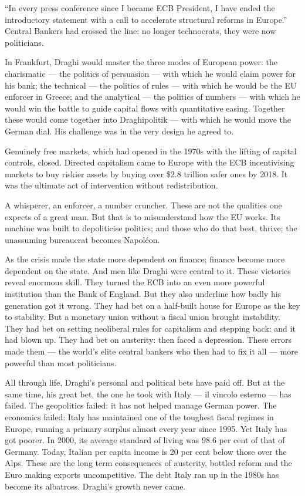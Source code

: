 \documentclass[
]{book}
\begin{document}
``In every press conference since I became ECB President, I have ended the introductory statement with a call to accelerate structural reforms in Europe.'' Central Bankers had crossed the line: no longer technocrats, they were now politicians.

In Frankfurt, Draghi would master the three modes of European power: the charismatic --- the politics of persuasion --- with which he would claim power for his bank; the technical --- the politics of rules --- with which he would be the EU enforcer in Greece; and the analytical --- the politics of numbers --- with which he would win the battle to guide capital flows with quantitative easing. Together these would come together into Draghipolitik --- with which he would move the German dial. His challenge was in the very design he agreed to.

Genuinely free markets, which had opened in the 1970s with the lifting of capital controls, closed. Directed capitalism came to Europe with the ECB incentivising markets to buy riskier assets by buying over \$2.8 trillion safer ones by 2018. It was the ultimate act of intervention without redistribution.

A whisperer, an enforcer, a number cruncher. These are not the qualities one expects of a great man. But that is to misunderstand how the EU works. Its machine was built to depoliticise politics; and those who do that best, thrive; the unassuming bureaucrat becomes Napoléon.

As the crisis made the state more dependent on finance; finance become more dependent on the state.
And men like Draghi were central to it. These victories reveal enormous skill. They turned the ECB into an even more powerful institution than the Bank of England. But they also underline how badly his generation got it wrong. They had bet on a half-built house for Europe as the key to stability. But a monetary union without a fiscal union brought instability. They had bet on setting neoliberal rules for capitalism and stepping back: and it had blown up. They had bet on austerity: then faced a depression. These errors made them --- the world's elite central bankers who then had to fix it all --- more powerful than most politicians.

All through life, Draghi's personal and political bets have paid off. But at the same time, his great bet, the one he took with Italy --- il vincolo esterno --- has failed. The geopolitics failed: it has not helped manage German power. The economics failed: Italy has maintained one of the toughest fiscal regimes in Europe, running a primary surplus almost every year since 1995. Yet Italy has got poorer.
In 2000, its average standard of living was 98.6 per cent of that of Germany. Today, Italian per capita income is 20 per cent below those over the Alps. These are the long term consequences of austerity, bottled reform and the Euro making exports uncompetitive. The debt Italy ran up in the 1980s has become its albatross. Draghi's growth never came.
\end{document}
